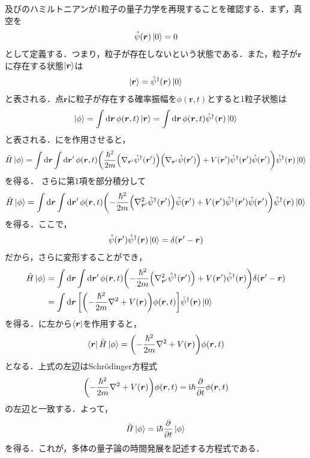 \documentclass{report}
\begin{document}
及びのハミルトニアンが1粒子の量子力学を再現することを確認する．まず，真空を
\begin{align}
  \hat{\psi}(\bm{r})\ket{0} = 0
\end{align}
として定義する．つまり，粒子が存在しないという状態である．また，粒子が$\bm{r}$に存在する状態$\ket{\bm{r}}$は
\begin{align}
  \ket{\bm{r}} = \hat{\psi}^{\dagger}(\bm{r}) \ket{0}
\end{align}
と表される．点$\bm{r}$に粒子が存在する確率振幅を$\phi(\bm{r},t)$とすると1粒子状態は
\begin{align}
  \ket{\phi} = \int \dd{\bm{r}} \phi(\bm{r},t) \ket{\bm{r}} = \int \dd{\bm{r}} \phi(\bm{r},t) \hat{\psi}^{\dagger}(\bm{r})\ket{0} \label{1-state}
\end{align}
と表される．にを作用させると，
\begin{align}
  \hat{H}\ket{\phi} = \int \dd{\bm{r}} \int \dd{\bm{r}'} \phi(\bm{r},t) \qty(\frac{\hbar^2}{2m}\qty(\nabla_{\bm{r}'}\hat{\psi}^{\dagger}(\bm{r}'))\qty(\nabla_{\bm{r}'}\hat{\psi}(\bm{r}')) + V(\bm{r}')\hat{\psi}^{\dagger}(\bm{r}')\hat{\psi}(\bm{r}'))\hat{\psi}^{\dagger}(\bm{r})\ket{0}
\end{align}
を得る．
さらに第1項を部分積分して
\begin{align}
  \hat{H}\ket{\phi} = \int \dd{\bm{r}} \int \dd{\bm{r}'} \phi(\bm{r},t) \qty(-\frac{\hbar^2}{2m}\qty(\nabla_{\bm{r}'}^2\hat{\psi}^{\dagger}(\bm{r}'))\hat{\psi}(\bm{r}') + V(\bm{r}')\hat{\psi}^{\dagger}(\bm{r}')\hat{\psi}(\bm{r}'))\hat{\psi}^{\dagger}(\bm{r})\ket{0}
\end{align}
を得る．ここで，
\begin{align}
  \hat{\psi}(\bm{r}')\hat{\psi}^{\dagger}(\bm{r}) \ket{0} = \delta(\bm{r}' - \bm{r})
\end{align}
だから，さらに変形することができ，
\begin{align}
  \hat{H}\ket{\phi} &= \int \dd{\bm{r}} \int \dd{\bm{r}'} \phi(\bm{r},t) \qty(-\frac{\hbar^2}{2m}\qty(\nabla_{\bm{r}'}^2\hat{\psi}^{\dagger}(\bm{r}')) + V(\bm{r}')\hat{\psi}^{\dagger}(\bm{r}))\delta(\bm{r}' - \bm{r})\\
  &= \int \dd{\bm{r}} \qty[\qty(-\frac{\hbar^2}{2m}\nabla^2 + V(\bm{r}))\phi(\bm{r},t)]\hat{\psi}^{\dagger}(\bm{r})\ket{0} \label{integral-of-state}
\end{align}
を得る．に左から$\bra{\bm{r}}$を作用すると，
\begin{align}
  \bra{\bm{r}}\hat{H}\ket{\phi} = \qty(-\frac{\hbar^2}{2m}\nabla^2 + V(\bm{r}))\phi(\bm{r},t)
\end{align}
となる．上式の左辺はSchrödinger方程式
\begin{align}
  \qty(-\frac{\hbar^2}{2m}\nabla^2 + V(\bm{r}))\phi(\bm{r},t) = \mathrm{i}\hbar\frac{\partial}{\partial t}\phi(\bm{r},t)
\end{align}
の左辺と一致する．よって，
\begin{align}
  \hat{H} \ket{\phi} = \mathrm{i}\hbar\frac{\partial}{\partial t}\ket{\phi}
\end{align}
を得る．これが，多体の量子論の時間発展を記述する方程式である．
\end{document}
